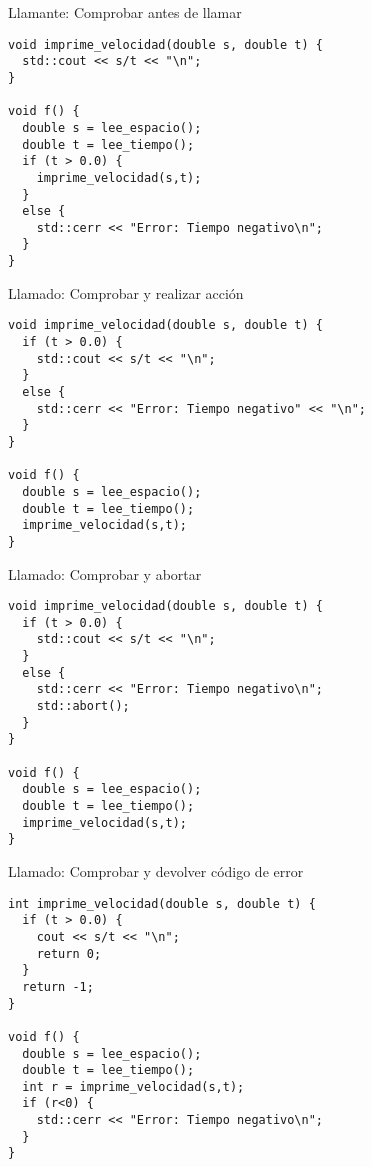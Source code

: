 \begin{frame}[fragile]{Llamante: Comprobar antes de llamar}
\begin{lstlisting}
void imprime_velocidad(double s, double t) {
  std::cout << s/t << "\n";
}

void f() {
  double s = lee_espacio();
  double t = lee_tiempo();
  if (t > 0.0) {
    imprime_velocidad(s,t);
  }
  else {
    std::cerr << "Error: Tiempo negativo\n";
  }
}
\end{lstlisting}
\end{frame}

\begin{frame}[fragile]{Llamado: Comprobar y realizar acción}
\begin{lstlisting}
void imprime_velocidad(double s, double t) {
  if (t > 0.0) {
    std::cout << s/t << "\n";
  }
  else {
    std::cerr << "Error: Tiempo negativo" << "\n";
  }
}

void f() {
  double s = lee_espacio();
  double t = lee_tiempo();
  imprime_velocidad(s,t);
}
\end{lstlisting}
\end{frame}

\begin{frame}[fragile]{Llamado: Comprobar y abortar}
\begin{lstlisting}
void imprime_velocidad(double s, double t) {
  if (t > 0.0) {
    std::cout << s/t << "\n";
  }
  else {
    std::cerr << "Error: Tiempo negativo\n";
    std::abort();
  }
}

void f() {
  double s = lee_espacio();
  double t = lee_tiempo();
  imprime_velocidad(s,t);
}
\end{lstlisting}
\end{frame}

\begin{frame}[fragile]{Llamado: Comprobar y devolver código de error}
\begin{lstlisting}
int imprime_velocidad(double s, double t) {
  if (t > 0.0) {
    cout << s/t << "\n";
    return 0;
  }
  return -1;
}

void f() {
  double s = lee_espacio();
  double t = lee_tiempo();
  int r = imprime_velocidad(s,t);
  if (r<0) {
    std::cerr << "Error: Tiempo negativo\n";
  }
}
\end{lstlisting}
\end{frame}


